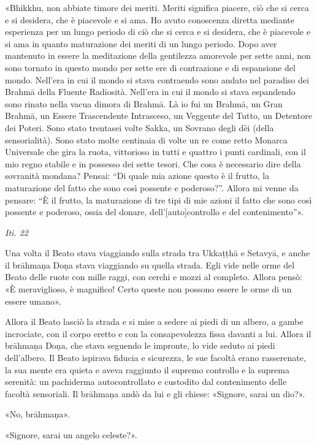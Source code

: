 «Bhikkhu, non abbiate timore dei meriti. Meriti significa piacere, ciò
che si cerca e si desidera, che è piacevole e si ama. Ho avuto
conoscenza diretta mediante esperienza per un lungo periodo di ciò che
si cerca e si desidera, che è piacevole e si ama in quanto maturazione
dei meriti di un lungo periodo. Dopo aver mantenuto in essere la
meditazione della gentilezza amorevole per sette anni, non sono tornato
in questo mondo per sette ere di contrazione e di espansione del mondo.
Nell’era in cui il mondo si stava contraendo sono andato nel paradiso
dei Brahmā della Fluente Radiosità. Nell’era in cui il mondo si stava
espandendo sono rinato nella vacua dimora di Brahmā. Là io fui un
Brahmā, un Gran Brahmā, un Essere Trascendente Intrasceso, un Veggente
del Tutto, un Detentore dei Poteri. Sono stato trentasei volte Sakka, un
Sovrano degli dèi (della sensorialità). Sono stato molte centinaia di
volte un re come retto Monarca Universale che gira la ruota, vittorioso
in tutti e quattro i punti cardinali, con il mio regno stabile e in
possesso dei sette tesori. Che cosa è necessario dire della sovranità
mondana? Pensai: “Di quale mia azione questo è il frutto, la maturazione
del fatto che sono così possente e poderoso?”. Allora mi venne da
pensare: “È il frutto, la maturazione di tre tipi di mie azioni il fatto
che sono così possente e poderoso, ossia del donare,
dell’[auto]controllo e del contenimento”».


\emph{Iti. 22}


Una volta il Beato stava viaggiando sulla strada tra Ukkaṭṭhā e Setavyā,
e anche il brāhmaṇa Doṇa stava viaggiando su quella strada. Egli vide
nelle orme del Beato delle ruote con mille raggi, con cerchi e mozzi al
completo. Allora pensò: «È meraviglioso, è magnifico! Certo queste non
possono essere le orme di un essere umano».


Allora il Beato lasciò la strada e si mise a sedere ai piedi di un
albero, a gambe incrociate, con il corpo eretto e con la consapevolezza
fissa davanti a lui. Allora il brāhmaṇa Doṇa, che stava seguendo le
impronte, lo vide seduto ai piedi dell’albero. Il Beato ispirava fiducia
e sicurezza, le sue facoltà erano rasserenate, la sua mente era quieta e
aveva raggiunto il supremo controllo e la suprema serenità: un
pachiderma autocontrollato e custodito dal contenimento delle facoltà
sensoriali. Il brāhmaṇa andò da lui e gli chiese: «Signore, sarai un
dio?».


«No, brāhmaṇa».


«Signore, sarai un angelo celeste?».


